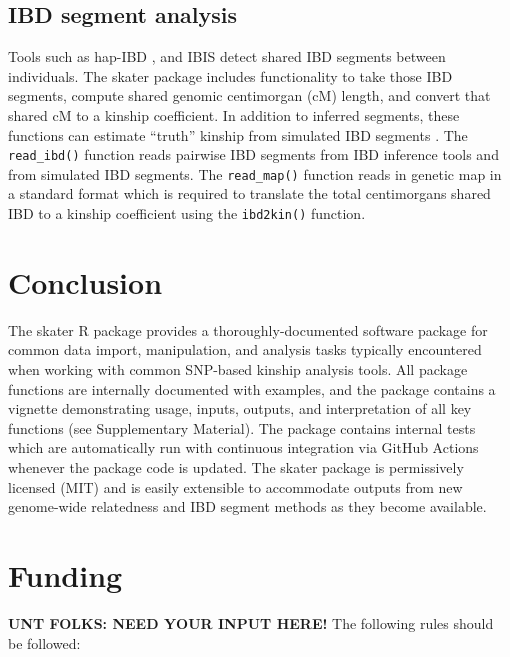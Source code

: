 \documentclass{bioinfo}
\begin{document}
\subsection{IBD segment analysis}

Tools such as hap-IBD \citep{zhou2020}, and IBIS \citep{seidman2020}
detect shared IBD segments between individuals. The skater package
includes functionality to take those IBD segments, compute shared
genomic centimorgan (cM) length, and convert that shared cM to a kinship
coefficient. In addition to inferred segments, these functions can
estimate ``truth'' kinship from simulated IBD segments
\citep{caballero2019}. The \texttt{read\_ibd()} function reads pairwise
IBD segments from IBD inference tools and from simulated IBD segments.
The \texttt{read\_map()} function reads in genetic map in a standard
format which is required to translate the total centimorgans shared IBD
to a kinship coefficient using the \texttt{ibd2kin()} function.

\section{Conclusion}

The skater R package provides a thoroughly-documented software package
for common data import, manipulation, and analysis tasks typically
encountered when working with common SNP-based kinship analysis tools.
All package functions are internally documented with examples, and the
package contains a vignette demonstrating usage, inputs, outputs, and
interpretation of all key functions (see Supplementary Material). The
package contains internal tests which are automatically run with
continuous integration via GitHub Actions whenever the package code is
updated. The skater package is permissively licensed (MIT) and is easily
extensible to accommodate outputs from new genome-wide relatedness and
IBD segment methods as they become available.

\section*{Funding}

\textbf{UNT FOLKS: NEED YOUR INPUT HERE!} The following rules should be
followed:
\end{document}
